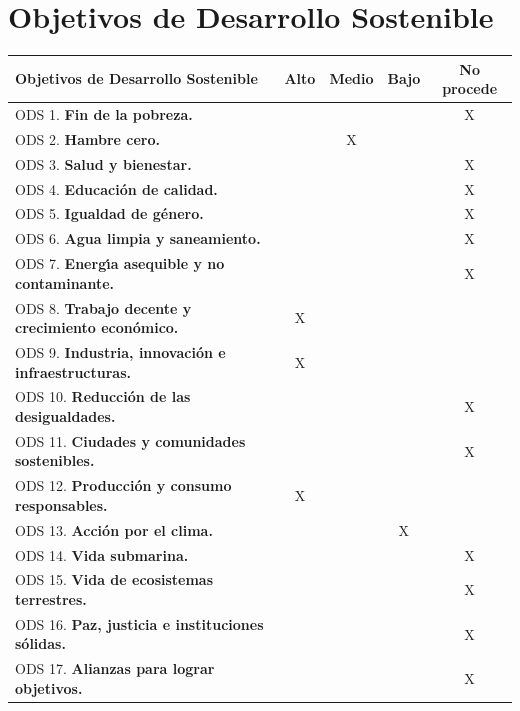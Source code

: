 \documentclass[11pt,spanish,listoffigures,listoftables]{tfgetsinf}
\begin{document}
\chapter{Objetivos de Desarrollo Sostenible}

\begin{tabularx}{\textwidth}{|>{\raggedright\arraybackslash}X|c|c|c|c|}\hline
   \textbf{Objetivos de Desarrollo Sostenible} & \textbf{Alto} & \textbf{Medio} & \textbf{Bajo} & \textbf{No procede} \\ \hline
   ODS 1.  \textbf{Fin de la pobreza.}                            & & & & X \\ \hline
   ODS 2.  \textbf{Hambre cero.}                                  & & X & & \\ \hline
   ODS 3.  \textbf{Salud y bienestar.}                            & & & & X\\ \hline
   ODS 4.  \textbf{Educaci\'on de calidad.}                       & & & & X \\ \hline
   ODS 5.  \textbf{Igualdad de g\'enero.}                         & & & & X \\ \hline
   ODS 6.  \textbf{Agua limpia y saneamiento.}                    & & & & X \\ \hline
   ODS 7.  \textbf{Energ\'{\i}a asequible y no contaminante.}     & & & & X\\ \hline
   ODS 8.  \textbf{Trabajo decente y crecimiento econ\'omico.}    & X & & & \\ \hline
   ODS 9.  \textbf{Industria, innovaci\'on e infraestructuras.}   & X & & & \\ \hline
   ODS 10. \textbf{Reducci\'on de las desigualdades.}             & & & & X\\ \hline
   ODS 11. \textbf{Ciudades y comunidades sostenibles.}           & & & & X\\ \hline
   ODS 12. \textbf{Producci\'on y consumo responsables.}          & X & & & \\ \hline
   ODS 13. \textbf{Acci\'on por el clima.}                        & & & X & \\ \hline
   ODS 14. \textbf{Vida submarina.}                               & & & & X \\ \hline
   ODS 15. \textbf{Vida de ecosistemas terrestres.}               & & & & X\\ \hline
   ODS 16. \textbf{Paz, justicia e instituciones s\'olidas.}      & & & & X\\ \hline
   ODS 17. \textbf{Alianzas para lograr objetivos.}               & & & & X\\ \hline
   \end{tabularx}
\end{document}
